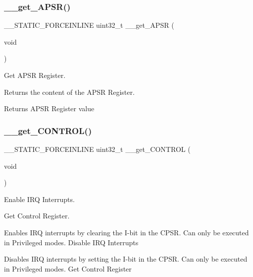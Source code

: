 \subsubsection{\texorpdfstring{\+\_\+\+\_\+get\+\_\+\+A\+P\+S\+R()}{\_\_get\_APSR()}}
{\footnotesize\ttfamily \+\_\+\+\_\+\+S\+T\+A\+T\+I\+C\+\_\+\+F\+O\+R\+C\+E\+I\+N\+L\+I\+NE uint32\+\_\+t \+\_\+\+\_\+get\+\_\+\+A\+P\+SR (\begin{DoxyParamCaption}\item[{void}]{ }\end{DoxyParamCaption})}



Get A\+P\+SR Register. 

Returns the content of the A\+P\+SR Register. \begin{DoxyReturn}{Returns}
A\+P\+SR Register value 
\end{DoxyReturn}
\mbox{\label{group___c_m_s_i_s___core___reg_acc_functions_ga7dd5c942bee32f055b90153feb950f59}} 
\subsubsection{\texorpdfstring{\+\_\+\+\_\+get\+\_\+\+C\+O\+N\+T\+R\+O\+L()}{\_\_get\_CONTROL()}}
{\footnotesize\ttfamily \+\_\+\+\_\+\+S\+T\+A\+T\+I\+C\+\_\+\+F\+O\+R\+C\+E\+I\+N\+L\+I\+NE uint32\+\_\+t \+\_\+\+\_\+get\+\_\+\+C\+O\+N\+T\+R\+OL (\begin{DoxyParamCaption}\item[{void}]{ }\end{DoxyParamCaption})}



Enable I\+RQ Interrupts. 

Get Control Register.

Enables I\+RQ interrupts by clearing the I-\/bit in the C\+P\+SR. Can only be executed in Privileged modes. Disable I\+RQ Interrupts

Disables I\+RQ interrupts by setting the I-\/bit in the C\+P\+SR. Can only be executed in Privileged modes. Get Control Register

